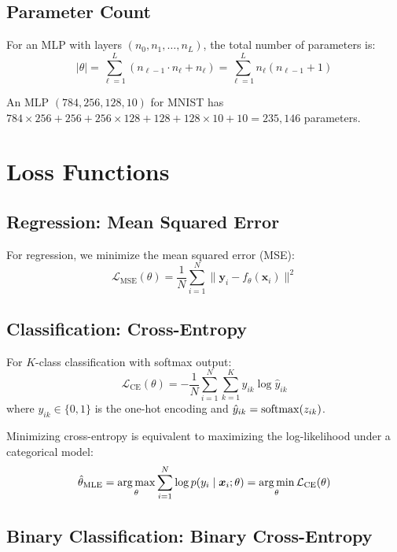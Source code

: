 \subsection{Parameter Count}

For an MLP with layers $(n_0, n_1, \ldots, n_L)$, the total number of parameters is:
\[
|\theta| = \sum_{\ell=1}^{L} (n_{\ell-1} \cdot n_\ell + n_\ell) = \sum_{\ell=1}^{L} n_\ell(n_{\ell-1} + 1)
\]

\begin{example}
An MLP $(784, 256, 128, 10)$ for MNIST has $784 \times 256 + 256 + 256 \times 128 + 128 + 128 \times 10 + 10 = 235{,}146$ parameters.
\end{example}

\section{Loss Functions}
\label{sec:loss}

\subsection{Regression: Mean Squared Error}

For regression, we minimize the mean squared error (MSE):
\[
\mathcal{L}_{\mathrm{MSE}}(\theta) = \frac{1}{N} \sum_{i=1}^{N} \|\bm{y}_i - f_\theta(\bm{x}_i)\|^2
\]

\subsection{Classification: Cross-Entropy}

For $K$-class classification with softmax output:
\[
\mathcal{L}_{\mathrm{CE}}(\theta) = -\frac{1}{N}\sum_{i=1}^{N} \sum_{k=1}^{K} y_{ik} \log \hat{y}_{ik}
\]
where $y_{ik} \in \{0,1\}$ is the one-hot encoding and $\hat{y}_{ik} = \mathrm{softmax}(z_{ik})$.

\begin{mathbox}[title=\textbf{Connection to Maximum Likelihood}]
Minimizing cross-entropy is equivalent to maximizing the log-likelihood under a categorical model:
\[
\hat{\theta}_{\mathrm{MLE}} = \operatorname*{arg\,max}_\theta \sum_{i=1}^N \log p(y_i \mid \bm{x}_i; \theta) = \operatorname*{arg\,min}_\theta \mathcal{L}_{\mathrm{CE}}(\theta)
\]
\end{mathbox}

\subsection{Binary Classification: Binary Cross-Entropy}

